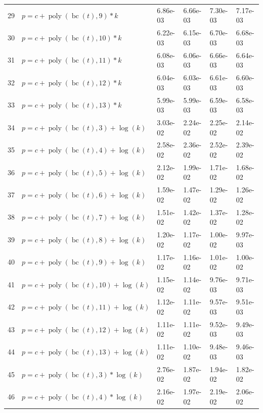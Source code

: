 \documentclass[12pt,a4paper]{article}
\DeclareMathOperator{\bc}{bc}
\DeclareMathOperator{\poly}{poly}
\begin{document}
\begin{longtable}[t]{ll>{\raggedleft\arraybackslash}p{2cm}>{\raggedleft\arraybackslash}p{2cm}>{\raggedleft\arraybackslash}p{2cm}>{\raggedleft\arraybackslash}p{2cm}}
\rowcolor{gray!6}  29 & $p = c + \poly\left( \bc(t), 9 \right) * k$ & 6.86e-03 & 6.66e-03 & 7.30e-03 & 7.17e-03\\
30 & $p = c + \poly\left( \bc(t), 10 \right) * k$ & 6.22e-03 & 6.15e-03 & 6.70e-03 & 6.68e-03\\
\rowcolor{gray!6}  31 & $p = c + \poly\left( \bc(t), 11 \right) * k$ & 6.08e-03 & 6.06e-03 & 6.66e-03 & 6.64e-03\\
32 & $p = c + \poly\left( \bc(t), 12 \right) * k$ & 6.04e-03 & 6.03e-03 & 6.61e-03 & 6.60e-03\\
\rowcolor{gray!6}  33 & $p = c + \poly\left( \bc(t), 13 \right) * k$ & 5.99e-03 & 5.99e-03 & 6.59e-03 & 6.58e-03\\
34 & $p = c + \poly\left( \bc(t), 3 \right) + \log(k)$ & 3.03e-02 & 2.24e-02 & 2.25e-02 & 2.14e-02\\
\rowcolor{gray!6}  35 & $p = c + \poly\left( \bc(t), 4 \right) + \log(k)$ & 2.58e-02 & 2.36e-02 & 2.52e-02 & 2.39e-02\\
36 & $p = c + \poly\left( \bc(t), 5 \right) + \log(k)$ & 2.12e-02 & 1.99e-02 & 1.71e-02 & 1.68e-02\\
\rowcolor{gray!6}  37 & $p = c + \poly\left( \bc(t), 6 \right) + \log(k)$ & 1.59e-02 & 1.47e-02 & 1.29e-02 & 1.26e-02\\
38 & $p = c + \poly\left( \bc(t), 7 \right) + \log(k)$ & 1.51e-02 & 1.42e-02 & 1.37e-02 & 1.28e-02\\
\rowcolor{gray!6}  39 & $p = c + \poly\left( \bc(t), 8 \right) + \log(k)$ & 1.20e-02 & 1.17e-02 & 1.00e-02 & 9.97e-03\\
40 & $p = c + \poly\left( \bc(t), 9 \right) + \log(k)$ & 1.17e-02 & 1.16e-02 & 1.01e-02 & 1.00e-02\\
\rowcolor{gray!6}  41 & $p = c + \poly\left( \bc(t), 10 \right) + \log(k)$ & 1.15e-02 & 1.14e-02 & 9.76e-03 & 9.71e-03\\
42 & $p = c + \poly\left( \bc(t), 11 \right) + \log(k)$ & 1.12e-02 & 1.11e-02 & 9.57e-03 & 9.51e-03\\
\rowcolor{gray!6}  43 & $p = c + \poly\left( \bc(t), 12 \right) + \log(k)$ & 1.11e-02 & 1.11e-02 & 9.52e-03 & 9.49e-03\\
44 & $p = c + \poly\left( \bc(t), 13 \right) + \log(k)$ & 1.11e-02 & 1.10e-02 & 9.48e-03 & 9.46e-03\\
\rowcolor{gray!6}  45 & $p = c + \poly\left( \bc(t), 3 \right) * \log(k)$ & 2.76e-02 & 1.87e-02 & 1.94e-02 & 1.82e-02\\
46 & $p = c + \poly\left( \bc(t), 4 \right) * \log(k)$ & 2.16e-02 & 1.97e-02 & 2.19e-02 & 2.06e-02\\

\end{longtable}
\end{document}
